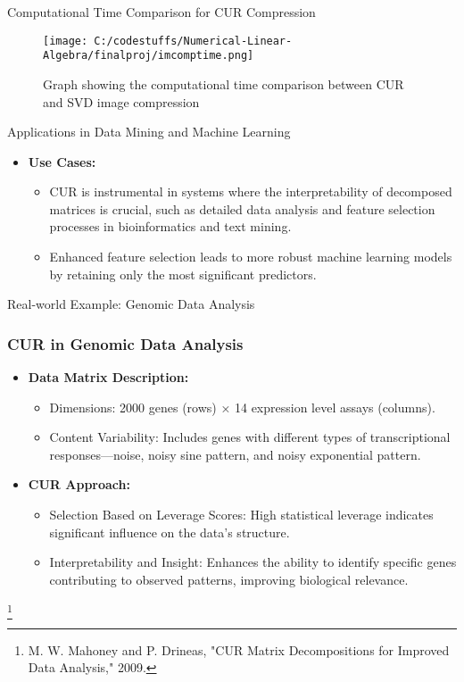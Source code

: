 \documentclass[pdf]{beamer}
\begin{document}
\begin{frame}{Computational Time Comparison for CUR Compression}
    \begin{figure}
        \centering
        \texttt{[image: C:/codestuffs/Numerical-Linear-Algebra/finalproj/imcomptime.png]}
        \caption{Graph showing the computational time comparison between CUR and SVD image compression}
        \label{fig:compression_time}
    \end{figure}
\end{frame}

\begin{frame}{Applications in Data Mining and Machine Learning}
    \begin{itemize}
        \item \textbf{Use Cases:}
            \begin{itemize}
                \item CUR is instrumental in systems where the interpretability of decomposed matrices is crucial, such as detailed data analysis and feature selection processes in bioinformatics and text mining.
                \item Enhanced feature selection leads to more robust machine learning models by retaining only the most significant predictors.
            \end{itemize}
    \end{itemize}
\end{frame}

\begin{frame}{Real-world Example: Genomic Data Analysis}
    \frametitle{CUR in Genomic Data Analysis}
    \begin{itemize}
        \item \textbf{Data Matrix Description:}
        \begin{itemize}
            \item Dimensions: 2000 genes (rows) × 14 expression level assays (columns).
            \item Content Variability: Includes genes with different types of transcriptional responses—noise, noisy sine pattern, and noisy exponential pattern.
        \end{itemize}
        \item \textbf{CUR Approach:}
        \begin{itemize}
            \item Selection Based on Leverage Scores: High statistical leverage indicates significant influence on the data's structure.
            \item Interpretability and Insight: Enhances the ability to identify specific genes contributing to observed patterns, improving biological relevance.
        \end{itemize}
    \end{itemize}
    \footnote{M. W. Mahoney and P. Drineas, "CUR Matrix Decompositions for Improved Data Analysis," 2009.}
\end{frame}
\end{document}
